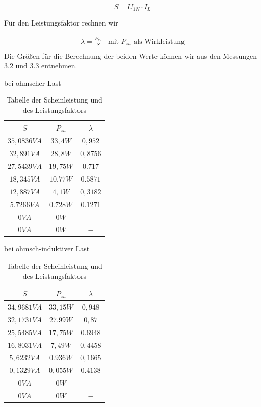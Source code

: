 \documentclass{article}
\begin{document}
$$S = U_{1N}\cdot I_{L}$$

Für den Leistungsfaktor rechnen wir

\[
  \begin{array}{ll}
    \lambda = \frac{P_{zu}}{S} & \text{mit $P_{zu}$ als Wirkleistung}\\
  \end{array}
\]
Die Größen für die Berechnung der beiden Werte können wir aus den Messungen 3.2 und 3.3 entnehmen.

\begin{table}[h]
  \centering
  \begin{subtable}{.4\linewidth}
    \centering
    \caption{bei ohmscher Last}
    \begin{tabular}{|c|c|c|}
      \hline
      $S$ & $P_{zu}$ & $\lambda$ \\
      \hline
      $35,0836VA$ & $33,4W$ & $0,952$\\
      \hline
      $32,891VA$ & $28,8W$ & $0,8756$\\
      \hline
      $27,5439VA$ & $19,75W$ & $0.717$\\
      \hline
      $18,345VA$ & $10.77W$ & $0.5871$\\
      \hline
      $12,887VA$ & $4,1W$ & $0,3182$\\
      \hline
      $5.7266VA$ & $0.728W$ & $0.1271$\\
      \hline
      $0VA$ & $0W$ & $-$\\
      \hline
      $0VA$ & $0W$ & $-$\\
      \hline
    \end{tabular}
  \end{subtable}
  \begin{subtable}{.4\linewidth}
    \centering
    \caption{bei ohmsch-induktiver Last}
    \begin{tabular}{|c|c|c|}
      \hline
      $S$ & $P_{zu}$ & $\lambda$ \\
      \hline
      $34,9681VA$ & $33,15W$ & $0,948$\\
      \hline
      $32,1731VA$ & $27.99W$ & $0,87$\\
      \hline
      $25,5485VA$ & $17,75W$ & $0.6948$\\
      \hline
      $16,8031VA$ & $7,49W$ & $0,4458$\\
      \hline
      $5,6232VA$ & $0.936W$ & $0,1665$\\
      \hline
      $0,1329VA$ & $0,055W$ & $0.4138$\\
      \hline
      $0VA$ & $0W$ & $-$\\
      \hline
      $0VA$ & $0W$ & $-$\\
      \hline
    \end{tabular}
  \end{subtable}
  \caption{Tabelle der Scheinleistung und des Leistungsfaktors}
  \label{tab:scheinfak}
\end{table}
\end{document}
